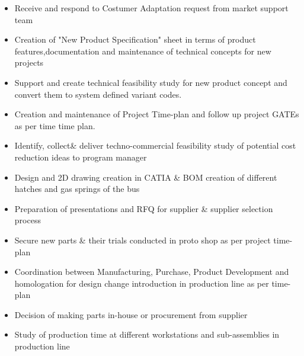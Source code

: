 \documentclass[10pt,a4paper]{altacv}
\begin{document}
\begin{itemize}
\item Receive and respond to Costumer Adaptation request from market support team
\item Creation of "New Product Specification" sheet in terms of product features,documentation and maintenance of technical concepts for new projects
\item Support and create technical feasibility study for new product concept and convert them to system defined variant codes.
\item Creation and maintenance of Project Time-plan and follow up project GATEs as per time time plan.
\item Identify, collect\& deliver techno-commercial feasibility study of potential cost reduction ideas to program manager
\item Design and 2D drawing creation in CATIA \& BOM creation of different hatches and gas springs of the bus
\item Preparation of presentations and RFQ for supplier \& supplier selection process
\item Secure new parts \& their trials conducted in proto shop as per project time-plan
\item Coordination between Manufacturing, Purchase, Product Development and homologation for design change introduction in production line as per time-plan
\item Decision of making parts in-house or procurement from supplier
\item Study of production time at different workstations and sub-assemblies in production line
\end{itemize}
\medskip
\bigskip
\vspace{20mm}


\vspace{2mm}



\end{document}
